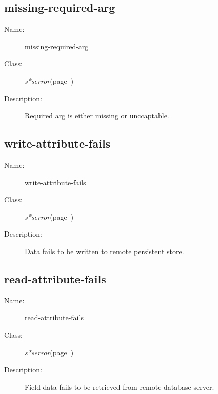 \subsection{missing-required-arg}
\label{missing-required-arg}

\begin{description}
\item [Name:]  missing-required-arg


\item [Class:]
{\sl s*serror}\hfill(page~\pageref{s*serror})


\item [Description:] 
Required arg is either missing or unccaptable. 



\end{description}
\horizontalline

\subsection{write-attribute-fails}
\label{write-attribute-fails}

\begin{description}
\item [Name:]  write-attribute-fails


\item [Class:]
{\sl s*serror}\hfill(page~\pageref{s*serror})


\item [Description:] 
Data fails to be written to remote persistent store.


\end{description}
\horizontalline

\subsection{read-attribute-fails}
\label{read-attribute-fails}

\begin{description}

\item [Name:]  read-attribute-fails


\item [Class:]
{\sl s*serror}\hfill(page~\pageref{s*serror})


\item [Description:] 
Field data fails to be retrieved from remote database
server.



\end{description}
\horizontalline


